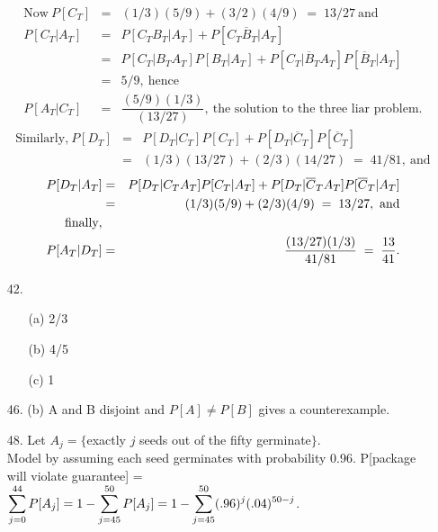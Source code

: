 \begin{enumerate}
	\newpage
	\vspace*{-.50in}
	\begin{eqnarray*}
	\text{Now}\ P[C_T] &=& (1/3)(5/9) + (3/2)(4/9) \;=\; 13/27\ \text{and} \\
	    P[C_T\vert A_T] &=& P[C_TB_T\vert A_T] + P[C_T\overline{B}_T\vert A_T] \\
	    	&=& P[C_T\vert B_TA_T]P[B_T\vert A_T] + P[C_T\vert \overline{B}_TA_T]P[\overline{B}_T\vert A_T] \\
	    	&=& 5/9,\ \text{hence} \\
	    P[A_T\vert C_T] &=& \dfrac{(5/9)(1/3)}{(13/27)},\ \text{the solution to the three liar problem.}	
	\end{eqnarray*}
	\vspace*{-.50in} 
	\begin{eqnarray*}
	\text{Similarly,}\ P[D_T] &=& P[D_T\vert C_T]P[C_T] + P[D_T\vert \overline{C}_T]P[\overline{C}_T] \\
	&=& (1/3)(13/27) + (2/3)(14/27) \;=\; 41/81,\ \text{and} 
	\end{eqnarray*}
	\vspace*{-.50in}
	\begin{eqnarray*}
	P[D_T\vert A_T] &=& P[D_T\vert C_TA_T]P[C_T\vert A_T] + P[D_T\vert \overline{C}_TA_T]P[\overline{C}_T\vert A_T] \\
	&=& (1/3)(5/9) + (2/3)(4/9) \;=\; 13/27,\ \text{and} \\
	\text{finally},\hfill && \\
	P[A_T\vert D_T] &=& \dfrac{(13/27)(1/3)}{41/81} \;=\; \dfrac{13}{41}.
	\end{eqnarray*}

	\item[42.] \begin{enumerate}
		\item[(a)] 2/3 
		\item[(b)] 4/5
		\item[(c)] 1
	\end{enumerate}	
	
	\item[46.] (b) A and B disjoint and $P[A] \ne P[B]$ gives a counterexample.
	
	\item[48.] Let $A_j = \{$exactly $j$ seeds out of the fifty germinate$\}$. \\
	Model by assuming each seed germinates with probability 0.96.  P[package will violate guarantee] = \\
	$\displaystyle \sum_{j=0}^{44} P[A_j] = 1 - \sum_{j=45}^{50}P[A_j] = 1 - \sum_{j=45}^{50}(.96)^j(.04)^{50-j}$.
	

\end{enumerate}
